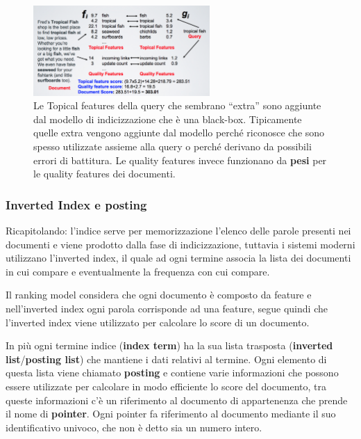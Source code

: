 \begin{figure}[htbp]
	\centering
	\includegraphics[width=0.6\textwidth]{./images/l6-modello-2}
	\caption{Le Topical features della query che sembrano ``extra'' sono aggiunte dal modello di indicizzazione che è una black-box. Tipicamente quelle extra vengono aggiunte dal modello perché riconosce che sono spesso utilizzate assieme alla query o perché derivano da possibili errori di battitura. Le quality features invece funzionano da \textbf{pesi} per le quality features dei documenti.}
\end{figure}

\subsubsection{Inverted Index e posting}

Ricapitolando: l'indice serve per memorizzazione l'elenco delle parole presenti nei documenti e viene prodotto dalla fase di indicizzazione, tuttavia i sistemi moderni utilizzano l'inverted index, il quale ad ogni termine associa la lista dei documenti in cui compare e eventualmente la frequenza con cui compare. 


Il ranking model considera che ogni documento è composto da feature e nell'inverted index ogni parola corrisponde ad una feature, segue quindi che l'inverted index viene utilizzato per calcolare lo score di un documento.

In più ogni termine indice (\textbf{index term}) ha la sua lista trasposta (\textbf{inverted list}/\textbf{posting list}) che mantiene i dati relativi al termine.
Ogni elemento di questa lista viene chiamato \textbf{posting} e contiene varie informazioni che possono essere utilizzate per calcolare in modo efficiente lo score del documento, tra queste informazioni c'è un riferimento al documento di appartenenza che prende il nome di \textbf{pointer}.
Ogni pointer fa riferimento al documento mediante il suo identificativo univoco, che non è detto sia un numero intero.

